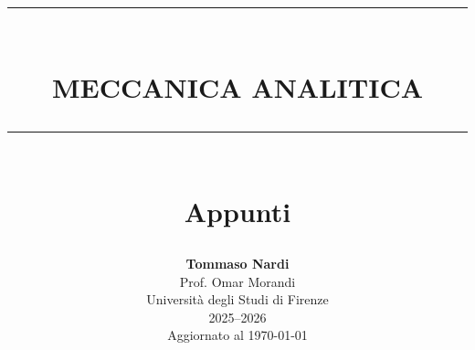 \documentclass{article}
\numberwithin{equation}{section}
\newcommand{\HRule}[1]{\rule{\linewidth}{#1}}
\begin{document}
\title{ 
    \vfill
    \HRule{1.5pt} \\
    \LARGE \textbf{\uppercase{Meccanica Analitica}} \\
    \HRule{2.0pt} \\ [0.6cm]
    \LARGE{Appunti}
    \vfill
}
\date{}
\author{\textbf{Tommaso Nardi} \\ 
        Prof. Omar Morandi \\
        Università degli Studi di Firenze \\
        2025--2026 \\
        Aggiornato al \today}

\maketitle
\thispagestyle{empty}
\cleardoublepage


\tableofcontents
\newpage



\cleardoublepage



\cleardoublepage

\end{document}
